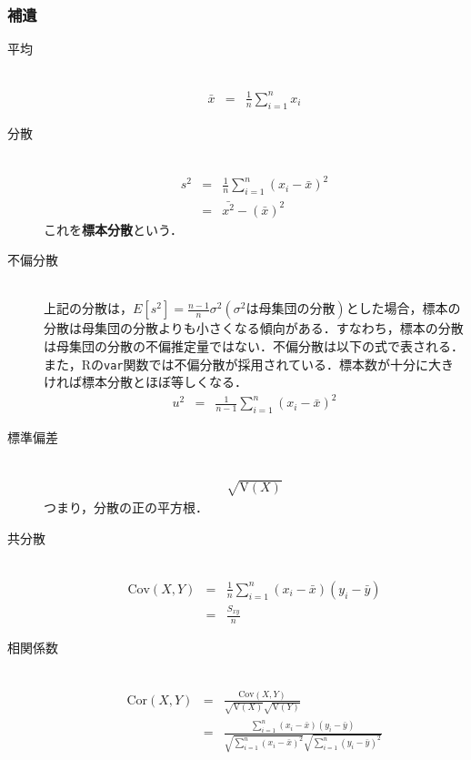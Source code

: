 \subsubsection{補遺}
\begin{description}
\item[平均]\mbox{}\\
\begin{eqnarray*}
\bar{x}&=&\frac{1}{n}\sum \limits ^n_{i=1}x_i
\end{eqnarray*}
\item[分散]\mbox{}\\
\begin{eqnarray*}
s^2 &=& \frac{1}{n} \sum_{i=1}^{n}(x_i - \bar{x})^2 \\
    &=& \bar{x^2}-\left( \bar{x} \right)^2
\end{eqnarray*}
これを{\bf 標本分散}という．
\item[不偏分散]\mbox{}\\
上記の分散は，$\displaystyle E[s^2] = \frac{n-1}{n} \sigma^2 (\sigma^2\mbox{は母集団の分散})$とした場合，標本の分散は母集団の分散よりも小さくなる傾向がある．すなわち，標本の分散は母集団の分散の不偏推定量ではない．不偏分散は以下の式で表される．また，Rの{\tt var}関数では不偏分散が採用されている．標本数が十分に大きければ標本分散とほぼ等しくなる．
\begin{eqnarray*}
u^2 &=& \frac{1}{n-1} \sum_{i=1}^{n}(x_i - \bar{x})^2 
\end{eqnarray*}
\item[標準偏差]\mbox{}\\
\begin{eqnarray*}
\sqrt{\mathrm{V}(X)}
\end{eqnarray*}
つまり，分散の正の平方根．
\item[共分散]\mbox{}\\
\begin{eqnarray*}
\mathrm{Cov}(X, Y)&=&\frac{1}{n}\sum_{i=1}^{n} (x_{i}-\bar{x})(y_{i}-\bar{y})\\
&=& \frac{S_{xy}}{n}
\end{eqnarray*}
\item[相関係数]\mbox{}\\
\begin{eqnarray*}
\mathrm{Cor}(X,Y)&=&\frac{\mathrm{Cov}(X,Y)}{\sqrt{\mathrm{V}(X)}\sqrt{\mathrm{V}(Y)}}\\
&=&\frac{ \displaystyle \sum_{i=1}^{n} (x_{i}-\bar{x})(y_{i}-\bar{y}) }{ \displaystyle \sqrt{\sum_{i=1}^n(x_{i}-\bar{x})^2} \sqrt{\sum_{i=1}^n(y_{i}-\bar{y})^2}}
\end{eqnarray*}

\end{description}
